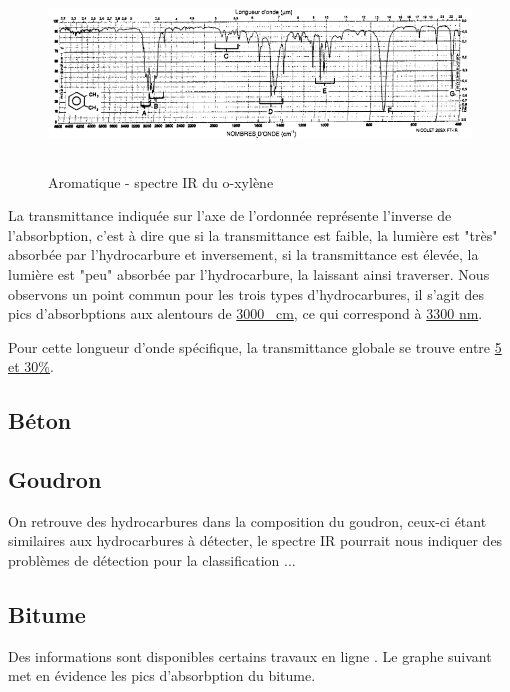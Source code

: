 \begin{figure}[H]
    \centering
    \includegraphics[height=5cm,angle=90]{assets/figures/aromatique.png}
    \caption{Aromatique - spectre IR du o-xylène \cite{Hydrocarbures}}
\end{figure}

\newpage
La transmittance indiquée sur l'axe de l'ordonnée représente l'inverse de l'absorbption, c'est à dire que si la transmittance est faible, la lumière
est "très" absorbée par l'hydrocarbure et inversement, si la transmittance est élevée, la lumière est "peu" absorbée par l'hydrocarbure, la laissant ainsi traverser.
Nous observons un point commun pour les trois types d'hydrocarbures, il s'agit des pics d'absorbptions aux alentours de \underline{3000 \si{\per\centi\metre}}, ce qui correspond à \underline{3300 \si{\nano\metre}}.

Pour cette longueur d'onde spécifique, la transmittance globale se trouve entre \underline{5 et 30\%}.

\subsection{Béton}

\subsection{Goudron}
On retrouve des hydrocarbures dans la composition du goudron, ceux-ci étant similaires aux hydrocarbures à détecter, le spectre IR pourrait nous indiquer des problèmes de détection pour la classification ...

\subsection{Bitume}
Des informations sont disponibles certains travaux en ligne \cite{Bitume}. Le graphe suivant met en évidence les pics d'absorbption du bitume.

